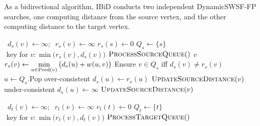{
\begin{algorithm}[t]
   \caption{As a bidirectional algorithm,
      IBiD conducts two independent DynamicSWSF-FP searches,
      one computing distance from the source vertex,
      and the other computing distance to the target vertex.}
   \label{alg:ibid-two-dynamicswsffps}
   \begin{minipage}[t]{8.2cm}
      \begin{algorithmic}[1]
          {\,\!}
               \State $d_s(v) \gets \infty; \;\; r_s(v) \gets \infty$
            \EndFor
            \State $r_s(s) \gets 0$
            \State $Q_s \gets \{ s \}$
               \Comment $\mbox{ key for } v: \min\big(r_s(v),d_s(v)\big)$
            \State $\mbox{\sc ProcessSourceQueue}()$
         \EndProcedure
          {$v$}
               \State $r_s(v) \gets \displaystyle\min_{u \in \mbox{\scriptsize Pred}(v)}
                  \big( d_s(u) + w(u,v) \big)$
            \EndIf
            \State Ensure $v \in Q_s$ iff $d_s(v) \neq r_s(v)$
         \EndProcedure
          {\,\!}
            \State $u \gets Q_s.\mbox{Pop}$
                  \Comment over-consistent
               \State $d_s(u) \gets r_s(u)$
                  \State $\mbox{\sc UpdateSourceDistance}(v)$
               \EndFor
            \Else
                  \Comment under-consistent
               \State $d_s(u) \gets \infty$
                  \State $\mbox{\sc UpdateSourceDistance}(v)$
               \EndFor
            \EndIf
         \EndProcedure
      \end{algorithmic}
   \end{minipage}
   \quad
   \begin{minipage}[t]{8.2cm}
      \begin{algorithmic}[1]
          {\,\!}
               \State $d_t(v) \gets \infty; \;\; r_t(v) \gets \infty$
            \EndFor
            \State $r_t(t) \gets 0$
            \State $Q_t \gets \{ t \}$
               \Comment $\mbox{ key for } v: \min\big(r_t(v),d_t(v)\big)$
            \State $\mbox{\sc ProcessTargetQueue}()$
         \EndProcedure

\end{algorithmic}
\end{minipage}
\end{algorithm}}
